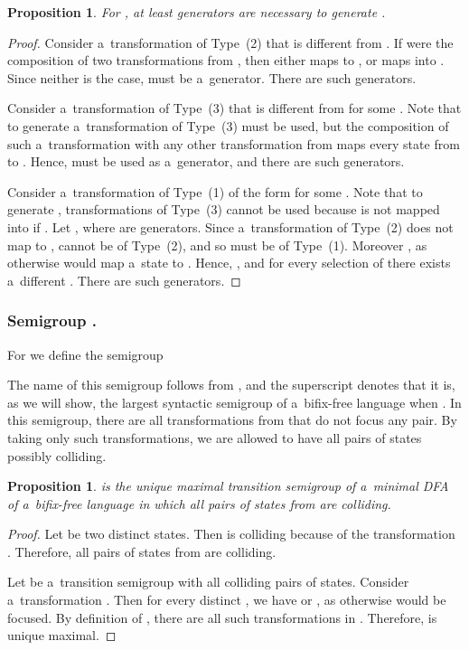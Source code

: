 \documentclass{amsart}
\newtheorem{proposition}[theorem]{Proposition}
\begin{document}
\begin{proposition}\label{pro:Wbf_alphabet_lower_bound}
For , at least  generators are necessary to generate .
\end{proposition}
\begin{proof}
Consider a~transformation  of Type~(2) that is different from .
If  were the composition of two transformations from , then either  maps  to , or  maps  into .
Since neither is the case,  must be a~generator.
There are  such generators.

Consider a~transformation  of Type~(3) that is different from  for some .
Note that to generate  a~transformation of Type~(3) must be used, but the composition of such a~transformation with any other transformation from  maps every state from  to .
Hence,  must be used as a~generator, and there are  such generators.

Consider a~transformation  of Type~(1) of the form  for some .
Note that to generate , transformations of Type~(3) cannot be used because  is not mapped into  if .
Let , where  are generators.
Since a~transformation of Type~(2) does not map  to ,  cannot be of Type~(2), and so must be of Type~(1).
Moreover , as otherwise  would map a~state  to .
Hence, , and for every selection of  there exists a~different .
There are  such generators.
\end{proof}

\subsubsection{Semigroup .}

For  we define the semigroup

The name of this semigroup follows from \cite{BLY12}, and the superscript denotes that it is, as we will show, the largest syntactic semigroup of a~bifix-free language when .
In this semigroup, there are all transformations from  that do not focus any pair.
By taking only such transformations, we are allowed to have all pairs of states possibly colliding.

\begin{proposition}\label{pro:Vbf_unique}
 is the unique maximal transition semigroup of a~minimal DFA  of a~bifix-free language in which all pairs of states from  are colliding.
\end{proposition}
\begin{proof}
Let  be two distinct states.
Then  is colliding because of the transformation .
Therefore, all pairs of states from  are colliding.

Let  be a~transition semigroup with all colliding pairs of states.
Consider a~transformation .
Then for every distinct , we have  or , as otherwise  would be focused.
By definition of , there are all such transformations  in .
Therefore,  is unique maximal.
\end{proof}
\end{document}
